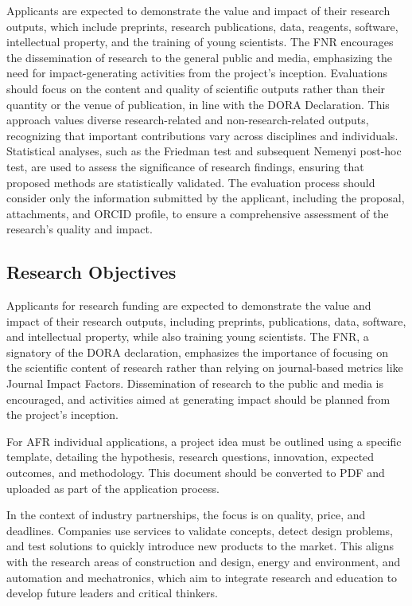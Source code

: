\documentclass{article}
\begin{document}
Applicants are expected to demonstrate the value and impact of their research outputs, which include preprints, research publications, data, reagents, software, intellectual property, and the training of young scientists. The FNR encourages the dissemination of research to the general public and media, emphasizing the need for impact-generating activities from the project's inception. Evaluations should focus on the content and quality of scientific outputs rather than their quantity or the venue of publication, in line with the DORA Declaration. This approach values diverse research-related and non-research-related outputs, recognizing that important contributions vary across disciplines and individuals. Statistical analyses, such as the Friedman test and subsequent Nemenyi post-hoc test, are used to assess the significance of research findings, ensuring that proposed methods are statistically validated. The evaluation process should consider only the information submitted by the applicant, including the proposal, attachments, and ORCID profile, to ensure a comprehensive assessment of the research's quality and impact.

\subsection{Research Objectives}

Applicants for research funding are expected to demonstrate the value and impact of their research outputs, including preprints, publications, data, software, and intellectual property, while also training young scientists. The FNR, a signatory of the DORA declaration, emphasizes the importance of focusing on the scientific content of research rather than relying on journal-based metrics like Journal Impact Factors. Dissemination of research to the public and media is encouraged, and activities aimed at generating impact should be planned from the project's inception.

For AFR individual applications, a project idea must be outlined using a specific template, detailing the hypothesis, research questions, innovation, expected outcomes, and methodology. This document should be converted to PDF and uploaded as part of the application process.

In the context of industry partnerships, the focus is on quality, price, and deadlines. Companies use services to validate concepts, detect design problems, and test solutions to quickly introduce new products to the market. This aligns with the research areas of construction and design, energy and environment, and automation and mechatronics, which aim to integrate research and education to develop future leaders and critical thinkers.
\end{document}
